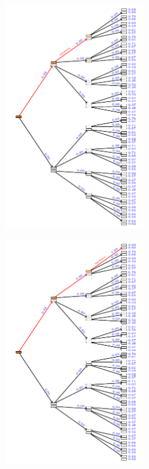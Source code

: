 \documentclass[aspectratio=169]{beamer}
\begin{document}
\begin{landscape}
    \begin{frame}
        \begin{figure}
            \includegraphics[width=0.55\textwidth]{trees/1/tex_tree_2.pdf}
        \end{figure}
    \end{frame}
\end{landscape}

\begin{landscape}
    \begin{frame}
        \begin{figure}
            \includegraphics[width=0.55\textwidth]{trees/1/tex_tree_3.pdf}
        \end{figure}
    \end{frame}
\end{landscape}
\end{document}
